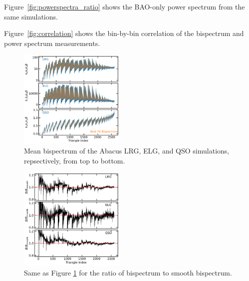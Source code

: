 Figure~\ref{fig:powerspectra_ratio} shows the BAO-only power spectrum from the same simulations. 

Figure~\ref{fig:correlation} shows the bin-by-bin correlation of the bispectrum and power spectrum measurements.





\begin{figure}
\includegraphics[width=0.45\textwidth]{figures/spectra.pdf}
\caption{Mean bispectrum of the Abacus LRG, ELG, and QSO simulations, repsectively, from top to bottom.}\label{fig:spectra}
\end{figure}

\begin{figure}
    \centering
    \includegraphics[width=0.45\textwidth]{figures/spectra_ratio.pdf}
    \caption{Same as Figure \ref{fig:spectra} for the ratio of bispectrum to smooth bispectrum.}
    \label{fig:spectra_ratio}
\end{figure}


